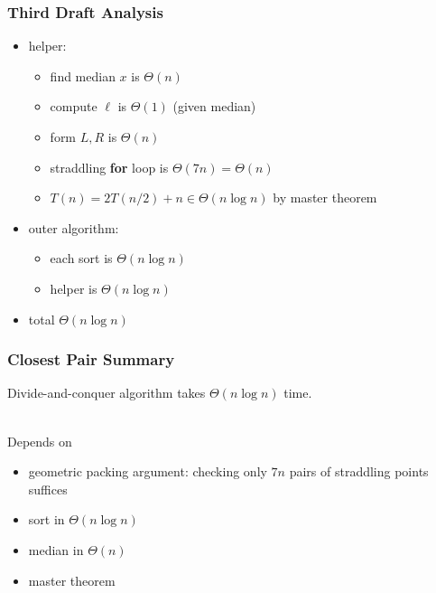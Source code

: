 \documentclass{beamer}
\newcommand{\stanza}{ \\~\ }
\begin{document}
\begin{frame} \frametitle{Third Draft Analysis}
\begin{itemize}
  \item helper:
    \begin{itemize}
      \item find median $x$ is $\Theta(n)$
      \item compute $\ell$ is $\Theta(1)$ (given median)
      \item form $L, R$ is $\Theta(n)$
      \item straddling \textbf{for} loop is $\Theta(7n) = \Theta(n)$
      \item $T(n) = 2 T(n/2) + n \in \Theta(n \log n)$ by master theorem
    \end{itemize}
  \item outer algorithm:
    \begin{itemize}
      \item each sort is $\Theta(n \log n)$
      \item helper is $\Theta(n \log n)$
    \end{itemize}
  \item total $\Theta(n \log n)$
\end{itemize}
\end{frame}

\begin{frame} \frametitle{Closest Pair Summary}
Divide-and-conquer algorithm takes $\Theta(n \log n)$ time. \stanza

Depends on
\begin{itemize}
  \item geometric packing argument: checking only $7n$ pairs of straddling points suffices
  \item sort in $\Theta(n \log n)$
  \item median in $\Theta(n)$
  \item master theorem
\end{itemize}
\end{frame}
\end{document}
